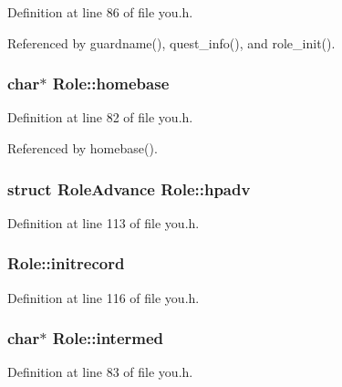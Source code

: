 Definition at line 86 of file you.\+h.



Referenced by guardname(), quest\+\_\+info(), and role\+\_\+init().

\hypertarget{structRole_ace7a79e835912cd60155902cdef2f00c}{
\subsubsection[{homebase}]{ char$\ast$ Role\+::homebase}}\label{structRole_ace7a79e835912cd60155902cdef2f00c}


Definition at line 82 of file you.\+h.



Referenced by homebase().

\hypertarget{structRole_a999b8055b41091d235626dd383d2fa72}{
\subsubsection[{hpadv}]{\setlength{\rightskip}{0pt plus 5cm}struct {\bf Role\+Advance} Role\+::hpadv}}\label{structRole_a999b8055b41091d235626dd383d2fa72}


Definition at line 113 of file you.\+h.

\hypertarget{structRole_a7f358ddd01aad9183c8f109e7fd6bac6}{
\subsubsection[{initrecord}]{ Role\+::initrecord}}\label{structRole_a7f358ddd01aad9183c8f109e7fd6bac6}


Definition at line 116 of file you.\+h.

\hypertarget{structRole_a25659d9956087171d17d31d3df5366b3}{
\subsubsection[{intermed}]{ char$\ast$ Role\+::intermed}}\label{structRole_a25659d9956087171d17d31d3df5366b3}


Definition at line 83 of file you.\+h.



